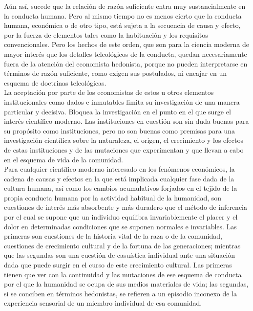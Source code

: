 Aún así, sucede que la relación de razón suficiente entra muy sustancialmente en la conducta humana. Pero al mismo tiempo no es menos cierto que la conducta humana, económica o de otro tipo, está sujeta a la secuencia de causa y efecto, por la fuerza de elementos tales como la habituación y los requisitos convencionales. Pero los hechos de este orden, que son para la ciencia moderna de mayor interés que los detalles teleológicos de la conducta, quedan necesariamente fuera de la atención del economista hedonista, porque no pueden interpretarse en términos de razón suficiente, como exigen sus postulados, ni encajar en un esquema de doctrinas teleológicas.\\

La aceptación por parte de los economistas de estos u otros elementos institucionales como dados e inmutables limita su investigación de una manera particular y decisiva. Bloquea la investigación en el punto en el que surge el interés científico moderno. Las instituciones en cuestión son sin duda buenas para su propósito como instituciones, pero no son buenas como premisas para una investigación científica sobre la naturaleza, el origen, el crecimiento y los efectos de estas instituciones y de las mutaciones que experimentan y que llevan a cabo en el esquema de vida de la comunidad.\\

Para cualquier científico moderno interesado en los fenómenos económicos, la cadena de causas y efectos en la que está implicada cualquier fase dada de la cultura humana, así como los cambios acumulativos forjados en el tejido de la propia conducta humana por la actividad habitual de la humanidad, son cuestiones de interés más absorbente y más duradero que el método de inferencia por el cual se supone que un individuo equilibra invariablemente el placer y el dolor en determinadas condiciones que se suponen normales e invariables. Las primeras son cuestiones de la historia vital de la raza o de la comunidad, cuestiones de crecimiento cultural y de la fortuna de las generaciones; mientras que las segundas son una cuestión de casuística individual ante una situación dada que puede surgir en el curso de este crecimiento cultural. Las primeras tienen que ver con la continuidad y las mutaciones de ese esquema de conducta por el que la humanidad se ocupa de sus medios materiales de vida; las segundas, si se conciben en términos hedonistas, se refieren a un episodio inconexo de la experiencia sensorial de un miembro individual de esa comunidad.\\

